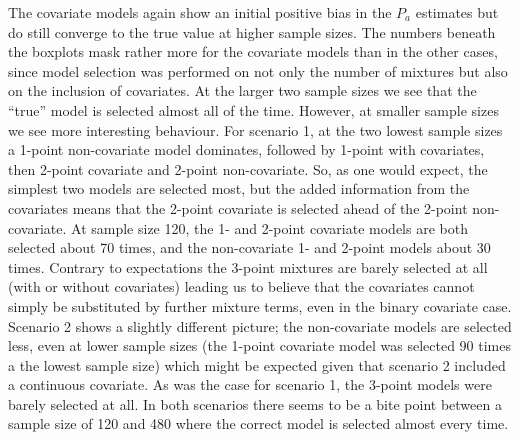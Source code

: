 \documentclass[useAMS,referee, usegraphicx]{biom}
\begin{document}
The covariate models again show an initial positive bias in the $P_a$ estimates but do still converge to the true value at higher sample sizes. The numbers beneath the boxplots mask rather more for the covariate models than in the other cases, since model selection was performed on not only the number of mixtures but also on the inclusion of covariates. At the larger two sample sizes we see that the ``true'' model is selected almost all of the time. However,  at smaller sample sizes we see more interesting behaviour. For scenario 1, at the two lowest sample sizes a 1-point non-covariate model dominates, followed by 1-point with covariates, then 2-point covariate and 2-point non-covariate. So, as one would expect, the simplest two models are selected most, but the added information from the covariates means that the 2-point covariate is selected ahead of the 2-point non-covariate. At sample size 120, the 1- and 2-point covariate models are both selected about 70 times, and the non-covariate 1- and 2-point models about 30 times. Contrary to expectations the 3-point mixtures are barely selected at all (with or without covariates) leading us to believe that the covariates cannot simply be substituted by further mixture terms, even in the binary covariate case. Scenario 2 shows a slightly different picture; the non-covariate models are selected less, even at lower sample sizes (the 1-point covariate model was selected 90 times a the lowest sample size) which might be expected given that scenario 2 included a continuous covariate. As was the case for scenario 1, the 3-point models were barely selected at all. In both scenarios there seems to be a bite point between a sample size of 120 and 480 where the correct model is selected almost every time.
	
\end{document}
